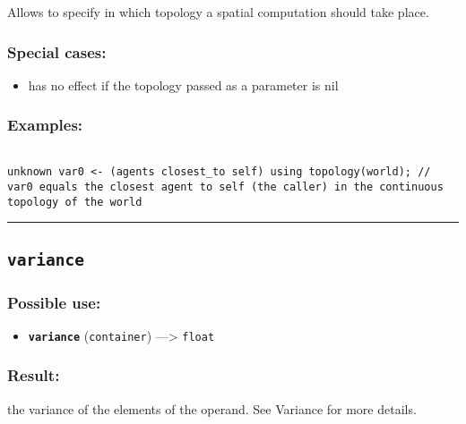 \documentclass[]{book}
\providecommand{\tightlist}{%
  \setlength{\itemsep}{0pt}\setlength{\parskip}{0pt}}
\theoremstyle{definition}
\theoremstyle{definition}
\theoremstyle{definition}
\theoremstyle{remark}
\begin{document}
Allows to specify in which topology a spatial computation should take
place.

\subsubsection{Special cases:}\label{special-cases-143}

\begin{itemize}
\tightlist
\item
  has no effect if the topology passed as a parameter is nil
\end{itemize}

\subsubsection{Examples:}\label{examples-377}

\begin{verbatim}
 
unknown var0 <- (agents closest_to self) using topology(world); // var0 equals the closest agent to self (the caller) in the continuous topology of the world
\end{verbatim}

\begin{center}\rule{0.5\linewidth}{\linethickness}\end{center}

\subsection{\texorpdfstring{\texttt{variance}}{variance}}\label{variance}

\subsubsection{Possible use:}\label{possible-use-548}

\begin{itemize}
\tightlist
\item
  \textbf{\texttt{variance}} (\texttt{container}) ---\textgreater{}
  \texttt{float}
\end{itemize}

\subsubsection{Result:}\label{result-528}

the variance of the elements of the operand. See Variance for more
details.
\end{document}
